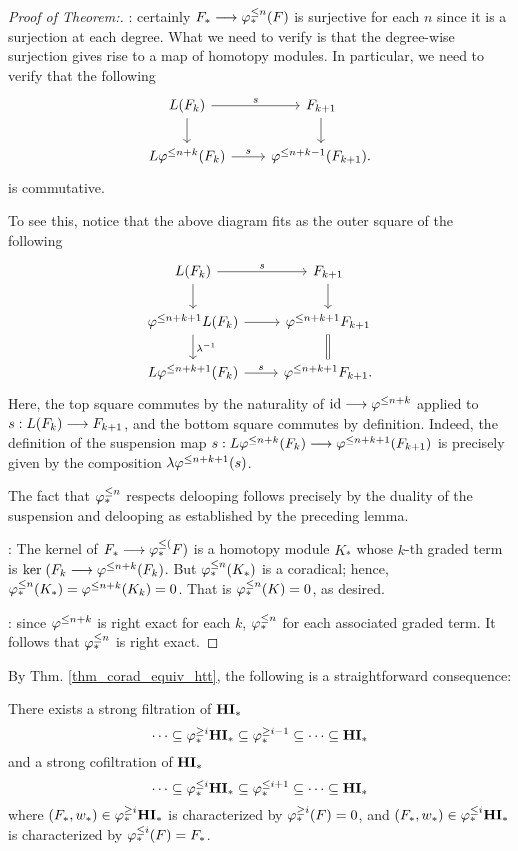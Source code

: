 \begin{proof}[Proof of Theorem:]

 : certainly $F_* \longrightarrow 
\varphi^{\leq n}_{*}(F)$ is surjective for each $n$ since it is a surjection 
at each degree. What we need to verify is that the degree-wise 
surjection gives rise to a map of homotopy modules. In particular, 
we need to verify that the following
\[
\begin{tikzcd}
L(F_k) \arrow{r}{\susp} \arrow{d} &
F_{k + 1} \arrow{d} \\
L \tlHI{n + k}(F_k) \arrow{r}{\susp} &
\tlHI{n + k - 1}(F_{k + 1}).
\end{tikzcd}
\]
is commutative.

To see this, notice that the above diagram fits as the outer 
square of the following
\[
\begin{tikzcd}
L(F_k) \arrow{r}{\susp} \arrow{d} &
F_{k + 1} \arrow{d} \\
\tlHI{n + k + 1} L(F_k) \arrow{r} \arrow{d}{\lambda^{-1}} &
\tlHI{n + k + 1} F_{k + 1} \arrow[equals]{d} \\
L \tlHI{n + k + 1}(F_k) \arrow{r}{\susp} &
\tlHI{n + k + 1} F_{k + 1}.
\end{tikzcd}
\]
Here, the top square commutes by the naturality of $\mathrm{id} \longrightarrow 
\varphi^{\leq n + k}$ applied to $s: L(F_k) \longrightarrow F_{k + 1}$, and the 
bottom square commutes by definition. Indeed, the definition of 
the suspension map $s: L \varphi^{\leq n + k}(F_k) \longrightarrow 
\varphi^{\leq n + k + 1}(F_{k + 1})$ is precisely given by the composition
$\lambda \varphi^{\leq n + k + 1}(s)$.

The fact that $\varphi^{\leq n}_{*}$ respects delooping follows precisely by
the duality of the suspension and delooping as established by the
preceding lemma.

 : The kernel of $F_* \longrightarrow 
\varphi^{\leq (}_{*}F)$ is a homotopy module $K_*$ whose $k$-th graded term is 
$\mathrm{ker}\; (F_k \longrightarrow \varphi^{\leq n + k}(F_k)$. But $\varphi^{\leq n}_{*}(K_*)$ is a 
coradical; hence, $\varphi^{\leq n}_{*}(K_*) = \varphi^{\leq n + k}(K_k) = 0$. That
is $\varphi^{\leq n}_{*}(K) = 0$, as desired.

 : since $\varphi^{\leq n + k}$ is 
right exact for each $k$, $\varphi^{\leq n}_{*}$ for each associated graded 
term. It follows that $\varphi^{\leq n}_{*}$ is right exact.
\end{proof}

By Thm. \ref{thm_corad_equiv_htt}, the following is a 
straightforward consequence:

\begin{cor}
There exists a strong filtration of $\mathbf{HI}_*$
\[
\cdots \subseteq \varphi^{\geq i}_{*}\mathbf{HI}_* \subseteq \varphi^{\geq i - 1}_{*} \subseteq 
   \cdots \subseteq \mathbf{HI}_*
\]
and a strong cofiltration of $\mathbf{HI}_*$
\[
\cdots \subseteq \varphi^{\leq i}_{*}\mathbf{HI}_* \subseteq \varphi^{\leq i + 1}_{*} \subseteq 
   \cdots \subseteq \mathbf{HI}_*
\]
where $(F_*, w_*) \in \varphi^{\geq i}_{*}\mathbf{HI}_*$ is characterized by
$\varphi^{\geq i}_{*}(F) = 0$, and $(F_*, w_*) \in \varphi^{\leq i}_{*}\mathbf{HI}_*$ is
characterized by $\varphi^{\leq i}_{*}(F) = F_*$.
\end{cor}
